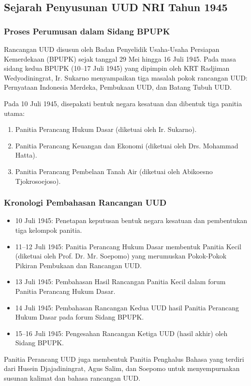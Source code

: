 \subsection{Sejarah Penyusunan UUD NRI Tahun 1945}
\subsubsection{Proses Perumusan dalam Sidang BPUPK}
Rancangan UUD disusun oleh Badan Penyelidik Usaha-Usaha Persiapan Kemerdekaan (BPUPK) sejak tanggal 29 Mei hingga 16 Juli 1945. Pada masa sidang kedua BPUPK (10--17 Juli 1945) yang dipimpin oleh KRT Radjiman Wedyodiningrat, Ir. Sukarno menyampaikan tiga masalah pokok rancangan UUD: Pernyataan Indonesia Merdeka, Pembukaan UUD, dan Batang Tubuh UUD.

Pada 10 Juli 1945, disepakati bentuk negara kesatuan dan dibentuk tiga panitia utama:
\begin{enumerate}
\item Panitia Perancang Hukum Dasar (diketuai oleh Ir. Sukarno).
\item Panitia Perancang Keuangan dan Ekonomi (diketuai oleh Drs. Mohammad Hatta).
\item Panitia Perancang Pembelaan Tanah Air (diketuai oleh Abikoesno Tjokrosoejoso).
\end{enumerate}

\subsubsection{Kronologi Pembahasan Rancangan UUD}
\begin{itemize}
\item 10 Juli 1945: Penetapan keputusan bentuk negara kesatuan dan pembentukan tiga kelompok panitia.
\item 11--12 Juli 1945: Panitia Perancang Hukum Dasar membentuk Panitia Kecil (diketuai oleh Prof. Dr. Mr. Soepomo) yang merumuskan Pokok-Pokok Pikiran Pembukaan dan Rancangan UUD.
\item 13 Juli 1945: Pembahasan Hasil Rancangan Panitia Kecil dalam forum Panitia Perancang Hukum Dasar.
\item 14 Juli 1945: Pembahasan Rancangan Kedua UUD hasil Panitia Perancang Hukum Dasar pada forum Sidang BPUPK.
\item 15--16 Juli 1945: Pengesahan Rancangan Ketiga UUD (hasil akhir) oleh Sidang BPUPK.
\end{itemize}

Panitia Perancang UUD juga membentuk Panitia Penghalus Bahasa yang terdiri dari Husein Djajadiningrat, Agus Salim, dan Soepomo untuk menyempurnakan susunan kalimat dan bahasa rancangan UUD.

